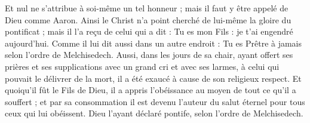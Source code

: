 Et nul ne s’attribue à soi-même un tel honneur ; mais il faut y être appelé de Dieu comme Aaron. Ainsi le Christ n’a point cherché de lui-même la gloire du pontificat ; mais il l’a reçu de celui qui a dit : Tu es mon Fils : je t’ai engendré aujourd’hui. Comme il lui dit aussi dans un autre endroit : Tu es Prêtre à jamais selon l’ordre de Melchisedech. Aussi, dans les jours de sa chair, ayant offert ses prières et ses supplications avec un grand cri et avec ses larmes, à celui qui pouvait le délivrer de la mort, il a été exaucé à cause de son religieux respect. Et quoiqu’il fût le Fils de Dieu, il a appris l’obéissance au moyen de tout ce qu’il a souffert ; et par sa consommation il est devenu l’auteur du salut éternel pour tous ceux qui lui obéissent. Dieu l’ayant déclaré pontife, selon l’ordre de Melchisedech.